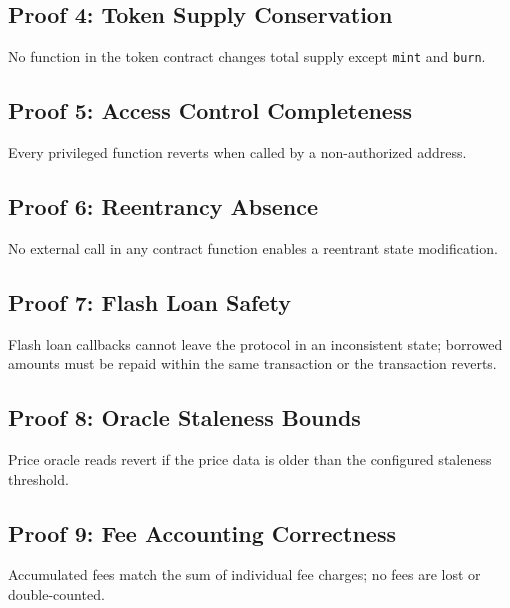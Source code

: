 \documentclass[11pt,a4paper]{article}
\begin{document}
\subsection{Proof 4: Token Supply Conservation}

No function in the token contract changes total supply except \texttt{mint} and
\texttt{burn}.

\subsection{Proof 5: Access Control Completeness}

Every privileged function reverts when called by a non-authorized address.

\subsection{Proof 6: Reentrancy Absence}

No external call in any contract function enables a reentrant state modification.

\subsection{Proof 7: Flash Loan Safety}

Flash loan callbacks cannot leave the protocol in an inconsistent state; borrowed
amounts must be repaid within the same transaction or the transaction reverts.

\subsection{Proof 8: Oracle Staleness Bounds}

Price oracle reads revert if the price data is older than the configured staleness
threshold.

\subsection{Proof 9: Fee Accounting Correctness}

Accumulated fees match the sum of individual fee charges; no fees are lost or
double-counted.
\end{document}
